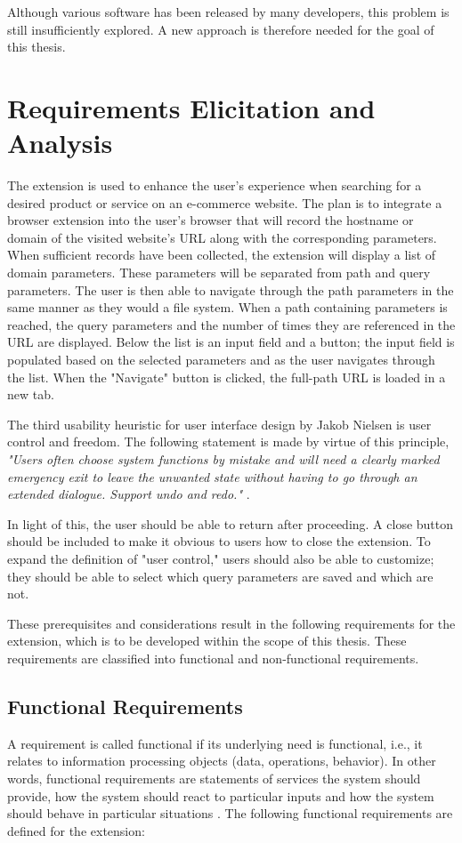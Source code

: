 Although various software has been released by many developers, this problem is still insufficiently explored. A new approach is therefore needed for the goal of this thesis.

\section{Requirements Elicitation and Analysis}
\label{requirements_analysis}
The extension is used to enhance the user's experience when searching for a desired product or service on an e-commerce website. The plan is to integrate a browser extension into the user's browser that will record the hostname or domain of the visited website's URL along with the corresponding parameters. When sufficient records have been collected, the extension will display a list of domain parameters. These parameters will be separated from path and query parameters. The user is then able to navigate through the path parameters in the same manner as they would a file system. When a path containing parameters is reached, the query parameters and the number of times they are referenced in the URL are displayed. Below the list is an input field and a button; the input field is populated based on the selected parameters and as the user navigates through the list. When the "Navigate" button is clicked, the full-path URL is loaded in a new tab.

The third usability heuristic for user interface design by Jakob Nielsen is user control and freedom. The following statement is made by virtue of this principle, \emph{"Users often choose system functions by mistake and will need a clearly marked emergency exit to leave the unwanted state without having to go through an extended dialogue. Support undo and redo."} \autocite{nielsen1994usability}.

In light of this, the user should be able to return after proceeding. A close button should be included to make it obvious to users how to close the extension. To expand the definition of "user control," users should also be able to customize; they should be able to select which query parameters are saved and which are not.

These prerequisites and considerations result in the following requirements for the extension, which is to be developed within the scope of this thesis. These requirements are classified into functional and non-functional requirements.

\subsection{Functional Requirements}
\label{functional_requirements}
A requirement is called functional if its underlying need is functional, i.e., it relates to information processing objects (data, operations, behavior). In other words, functional requirements are statements of services the system should provide, how the system should react to particular inputs and how the system should behave in particular situations \autocite{sommerville2011software}. The following functional requirements are defined for the extension:

